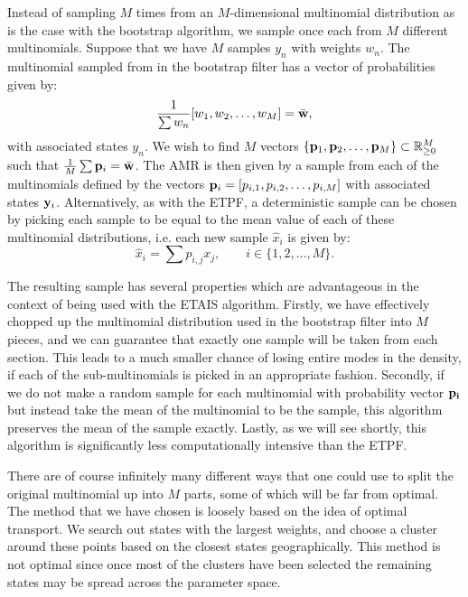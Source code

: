 \documentclass[final]{siamltex}
\begin{document}
Instead of sampling $M$ times from an $M$-dimensional multinomial
distribution as is the case with the bootstrap algorithm, we sample
once each from $M$ different multinomials. Suppose that we have $M$
samples $y_n$ with weights $w_n$. The multinomial sampled from in the
bootstrap filter has a vector of probabilities given by:
\begin{equation*}
\frac{1}{\sum w_n} [w_1,w_2,\ldots,w_M] = \bar{\bf w},
\end{equation*}
with associated states $y_n$.
We wish to find $M$ vectors $\{{\bf p}_1,{\bf p}_2,\ldots,{\bf p}_M\}
\subset \mathbb{R}^M_{\ge 0}$
such that  $\frac{1}{M} \sum {\bf p}_i = \bar{\bf w}$. The AMR is then
given by a sample from each of the multinomials defined by the vectors
${\bf p}_i = [p_{i,1},p_{i,2},\ldots,p_{i,M}]$ with associated states ${\bf y}_i$. Alternatively, as with the ETPF, a deterministic sample
can be chosen by picking each sample to be equal to the mean value of
each of these multinomial distributions, i.e. each new sample
$\hat{x}_i$ is given by:
\begin{equation}
\hat{x}_i = \sum p_{i,j} x_j, \qquad i \in \{1,2,\ldots,M\}.
\end{equation}

The resulting sample has several properties which are advantageous in
the context of being used with the ETAIS algorithm. Firstly, we have
effectively chopped up the multinomial distribution used in the
bootstrap filter into $M$ pieces, and we can guarantee that exactly
one sample will be taken from each section. This leads to a much
smaller chance of losing entire modes in the density, if each of the
sub-multinomials is picked in an appropriate fashion. Secondly, if we do not make a random sample for
each multinomial with probability vector $\bf p_i$ but instead take
the mean of the multinomial to be the sample, this algorithm preserves
the mean of the sample exactly. Lastly, as we will see shortly, this
algorithm is significantly less computationally intensive than the
ETPF.

There are of course infinitely many different ways that one could use
to split the original multinomial up into $M$ parts, some of which
will be far from optimal. The method that we have chosen is loosely
based on the idea of optimal transport. We search out states with the
largest weights, and choose a cluster around these points based on
the closest states geographically. This method is not optimal since
once most of the clusters have been selected the remaining states
may be spread across the parameter space.
\end{document}
